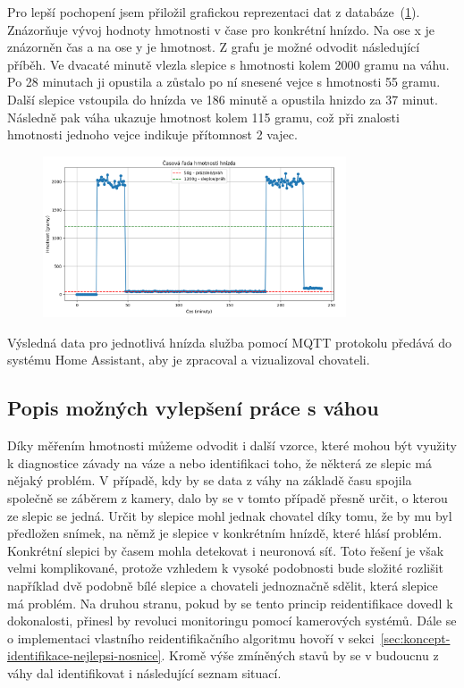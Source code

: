Pro lepší pochopení jsem přiložil grafickou reprezentaci dat z databáze~(\ref{fig:weight_egg_chart_timeline}).
Znázorňuje vývoj hodnoty hmotnosti v čase pro konkrétní hnízdo.
Na ose x je znázorněn čas a na ose y je hmotnost.
Z grafu je možné odvodit následující příběh.
Ve dvacaté minutě vlezla slepice s hmotnosti kolem 2000 gramu na váhu.
Po 28 minutach ji opustila a zůstalo po ní snesené vejce s hmotnosti 55 gramu.
Další slepice vstoupila do hnízda ve 186 minutě a opustila hnizdo za 37 minut.
Následně pak váha ukazuje hmotnost kolem 115 gramu, což při znalosti hmotnosti jednoho vejce indikuje přítomnost 2 vajec.


\begin{figure}[H]
    \centering
    \includegraphics[width=0.8\textwidth]{img/weight_egg_chart_timeline}
    \label{fig:weight_egg_chart_timeline}
\end{figure}

Výsledná data pro jednotlivá hnízda služba pomocí MQTT protokolu předává do systému Home Assistant, aby je zpracoval a vizualizoval chovateli.\newline


\subsection*{Popis možných vylepšení práce s váhou}
Díky měřením hmotnosti můžeme odvodit i další vzorce, které mohou být využity k diagnostice závady na váze a nebo identifikaci toho, že některá ze slepic má nějaký problém.
V případě, kdy by se data z váhy na základě času spojila společně se záběrem z kamery, dalo by se v tomto případě přesně určit, o kterou ze slepic se jedná. \newline
Určit by slepice mohl jednak chovatel díky tomu, že by mu byl předložen snímek, na němž je slepice v konkrétním hnízdě, které hlásí problém.
Konkrétní slepici by časem mohla detekovat i neuronová síť. \newline
Toto řešení je však velmi komplikované, protože vzhledem k vysoké podobnosti bude složité rozlišit například dvě podobně bílé slepice a chovateli jednoznačně sdělit, která slepice má problém.
Na druhou stranu, pokud by se tento princip reidentifikace dovedl k dokonalosti, přinesl by revoluci monitoringu pomocí kamerových systémů.
Dále se o implementaci vlastního reidentifikačního algoritmu hovoří v sekci~\ref{sec:koncept-identifikace-nejlepsi-nosnice}.
\newline
Kromě výše zmíněných stavů by se v budoucnu z váhy dal identifikovat i následující seznam situací.

